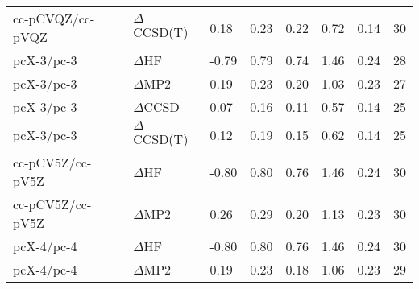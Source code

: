 \begin{table}
\begin{tabular}{l l l l l l l l }
    cc-pCVQZ/cc-pVQZ & $\Delta$CCSD(T) & 0.18 & 0.23 & 0.22 & 0.72 & 0.14 & 30 \\ 
    pcX-3/pc-3 & $\Delta$HF & -0.79 & 0.79 & 0.74 & 1.46 & 0.24 & 28 \\ 
    pcX-3/pc-3 & $\Delta$MP2 & 0.19 & 0.23 & 0.20 & 1.03 & 0.23 & 27 \\ 
    pcX-3/pc-3 & $\Delta$CCSD & 0.07 & 0.16 & 0.11 & 0.57 & 0.14 & 25 \\ 
    pcX-3/pc-3 & $\Delta$CCSD(T) & 0.12 & 0.19 & 0.15 & 0.62 & 0.14 & 25 \\ 
    cc-pCV5Z/cc-pV5Z & $\Delta$HF & -0.80 & 0.80 & 0.76 & 1.46 & 0.24 & 30 \\ 
    cc-pCV5Z/cc-pV5Z & $\Delta$MP2 & 0.26 & 0.29 & 0.20 & 1.13 & 0.23 & 30 \\ 
    pcX-4/pc-4 & $\Delta$HF & -0.80 & 0.80 & 0.76 & 1.46 & 0.24 & 30 \\ 
    pcX-4/pc-4 & $\Delta$MP2 & 0.19 & 0.23 & 0.18 & 1.06 & 0.23 & 29 \\ 
    \bottomrule
  \end{tabular}
\end{table}
